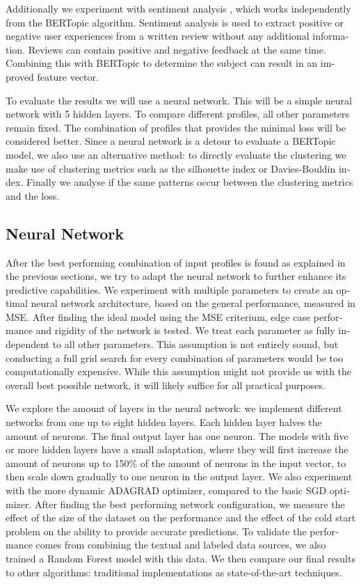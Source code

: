 \begin{otherlanguage}{english}
\begin{multicols}{2}
Additionally we experiment with sentiment analysis \cite{sentiment_transformer_paper_eng_summary}, which works independently from the BERTopic algorithm. Sentiment analysis is used to extract positive or negative user experiences from a written review without any additional information. Reviews can contain positive and negative feedback at the same time. Combining this with BERTopic to determine the subject can result in an improved feature vector.

To evaluate the results we will use a neural network. This will be a simple neural network with 5 hidden layers. To compare different profiles, all other parameters remain fixed. The combination of profiles that provides the minimal loss will be considered better. Since a neural network is a detour to evaluate a BERTopic model, we also use an alternative method: to directly evaluate the clustering we make use of clustering metrics such as the silhouette index or Davies-Bouldin index. Finally we analyse if the same patterns occur between the clustering metrics and the loss.


\subsection*{Neural Network}
After the best performing combination of input profiles is found as explained in the previous sections, we try to adapt the neural network to further enhance its predictive capabilities. We experiment with multiple parameters to create an optimal neural network architecture, based on the general performance, measured in MSE. After finding the ideal model using the MSE criterium, edge case performance and rigidity of the network is tested. We treat each parameter as fully independent to all other parameters. This assumption is not entirely sound, but conducting a full grid search for every combination of parameters would be too computationally expensive. While this assumption might not provide us with the overall best possible network, it will likely suffice for all practical purposes.

We explore the amount of layers in the neural network: we implement different networks from one up to eight hidden layers. Each hidden layer halves the amount of neurons. The final output layer has one neuron. The models with five or more hidden layers have a small adaptation, where they will first increase the amount of neurons up to 150\% of the amount of neurons in the input vector, to then scale down gradually to one neuron in the output layer.\newline
We also experiment with the more dynamic ADAGRAD optimizer, compared to the basic SGD optimizer. After finding the best performing network configuration, we measure the effect of the size of the dataset on the performance and the effect of the cold start problem on the ability to provide accurate predictions.\newline
To validate the performance comes from combining the textual and labeled data sources, we also trained a Random Forest model with this data. We then compare our final results to other algorithms: traditional implementations as state-of-the-art techniques.



\end{multicols}
\end{otherlanguage}
